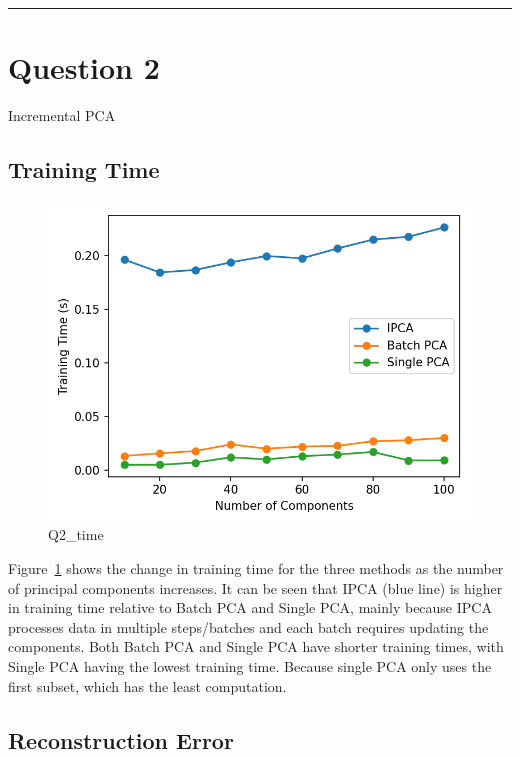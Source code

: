\clearpage
\rule{\textwidth}{1mm}
\vspace{-2em}
\section{Question 2} Incremental PCA
\label{sec:Q2}

\subsection{Training Time}

\begin{figure}[h]
	\centering
	\includegraphics[width=0.8\linewidth]{Ressources/Q2_time.png}
	
	\caption{Q2\_time}
	\label{fig:Q2_time}
\end{figure}

Figure~\ref{fig:Q2_time} shows the change in training time for the three methods as the number of principal components increases. It can be seen that IPCA (blue line) is higher in training time relative to Batch PCA and Single PCA, mainly because IPCA processes data in multiple steps/batches and each batch requires updating the components. Both Batch PCA and Single PCA have shorter training times, with Single PCA having the lowest training time. Because single PCA only uses the first subset, which has the least computation.

\subsection{Reconstruction Error}


